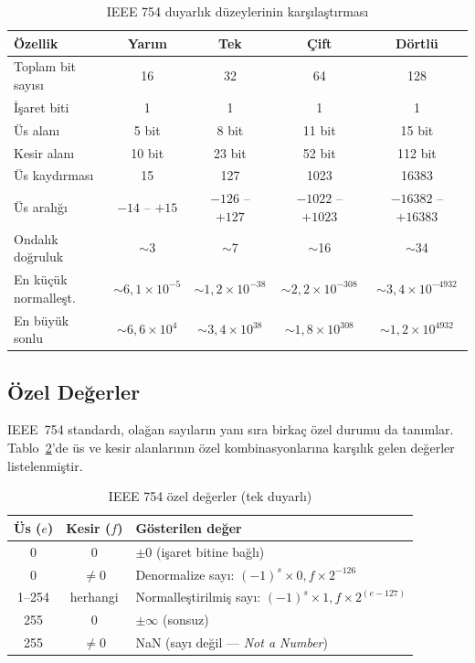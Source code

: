 \begin{table}[H]
\centering
\caption{IEEE 754 duyarlık düzeylerinin karşılaştırması}
\label{tab:ieee754-karsilastirma}
\small
\begin{tabular}{lcccc}
\toprule
\textbf{Özellik} & \textbf{Yarım} & \textbf{Tek} & \textbf{Çift} & \textbf{Dörtlü} \\
\midrule
Toplam bit sayısı       & 16     & 32     & 64      & 128 \\
İşaret biti             & 1      & 1      & 1       & 1 \\
Üs alanı                & 5 bit  & 8 bit  & 11 bit  & 15 bit \\
Kesir alanı             & 10 bit & 23 bit & 52 bit  & 112 bit \\
Üs kaydırması           & 15     & 127    & 1023    & 16383 \\
Üs aralığı              & $-14$ -- $+15$ & $-126$ -- $+127$ & $-1022$ -- $+1023$ & $-16382$ -- $+16383$ \\
Ondalık doğruluk        & $\sim$3    & $\sim$7    & $\sim$16   & $\sim$34 \\
En küçük normalleşt.    & $\sim 6{,}1 \times 10^{-5}$ & $\sim 1{,}2 \times 10^{-38}$ & $\sim 2{,}2 \times 10^{-308}$ & $\sim 3{,}4 \times 10^{-4932}$ \\
En büyük sonlu          & $\sim 6{,}6 \times 10^{4}$  & $\sim 3{,}4 \times 10^{38}$  & $\sim 1{,}8 \times 10^{308}$  & $\sim 1{,}2 \times 10^{4932}$ \\
\bottomrule
\end{tabular}
\end{table}

\subsection{Özel Değerler}
\label{sec:ekA-ieee754-ozel}

IEEE~754 standardı, olağan sayıların yanı sıra birkaç özel durumu da tanımlar. Tablo~\ref{tab:ieee754-ozel}'de üs ve kesir alanlarının özel kombinasyonlarına karşılık gelen değerler listelenmiştir.

\begin{table}[H]
\centering
\caption{IEEE 754 özel değerler (tek duyarlı)}
\label{tab:ieee754-ozel}
\begin{tabular}{ccl}
\toprule
\textbf{Üs ($e$)} & \textbf{Kesir ($f$)} & \textbf{Gösterilen değer} \\
\midrule
0       & 0       & $\pm 0$ (işaret bitine bağlı) \\
0       & $\neq 0$  & Denormalize sayı: $(-1)^s \times 0{,}f \times 2^{-126}$ \\
1--254  & herhangi  & Normalleştirilmiş sayı: $(-1)^s \times 1{,}f \times 2^{(e-127)}$ \\
255     & 0       & $\pm \infty$ (sonsuz) \\
255     & $\neq 0$  & NaN (sayı değil — \textit{Not a Number}) \\
\bottomrule
\end{tabular}
\end{table}

